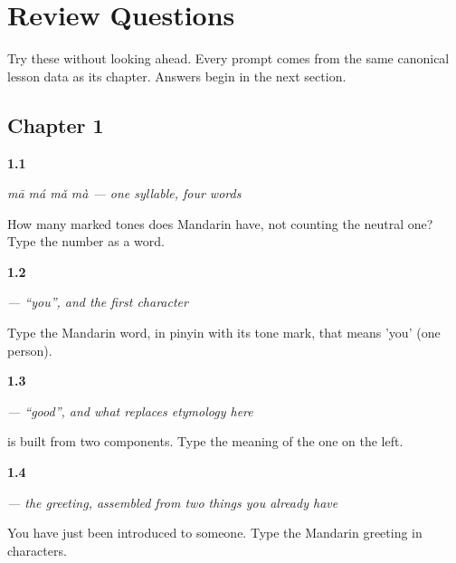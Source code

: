 
\chapter*{Review Questions}

Try these without looking ahead. Every prompt comes from the same canonical lesson data as its chapter. Answers begin in the next section.

\section*{Chapter 1}

\noindent\begin{minipage}[t]{\linewidth}
\raggedright
\hypertarget{review-ZH-C01-tones-count}{\textbf{1.1}} \emph{mā má mǎ mà — one syllable, four words}\par
\small How many marked tones does Mandarin have, not counting the neutral one? Type the number as a word.
\end{minipage}\par\medskip

\noindent\begin{minipage}[t]{\linewidth}
\raggedright
\hypertarget{review-ZH-C01-ni-meaning}{\textbf{1.2}} \emph{ — \textquotedblleft{}you\textquotedblright{}, and the first character}\par
\small Type the Mandarin word, in pinyin with its tone mark, that means 'you' (one person).
\end{minipage}\par\medskip

\noindent\begin{minipage}[t]{\linewidth}
\raggedright
\hypertarget{review-ZH-C01-hao-components}{\textbf{1.3}} \emph{ — \textquotedblleft{}good\textquotedblright{}, and what replaces etymology here}\par
\small {} is built from two components. Type the meaning of the one on the left.
\end{minipage}\par\medskip

\noindent\begin{minipage}[t]{\linewidth}
\raggedright
\hypertarget{review-ZH-C01-nihao-greeting}{\textbf{1.4}} \emph{ — the greeting, assembled from two things you already have}\par
\small You have just been introduced to someone. Type the Mandarin greeting in characters.
\end{minipage}\par\medskip

